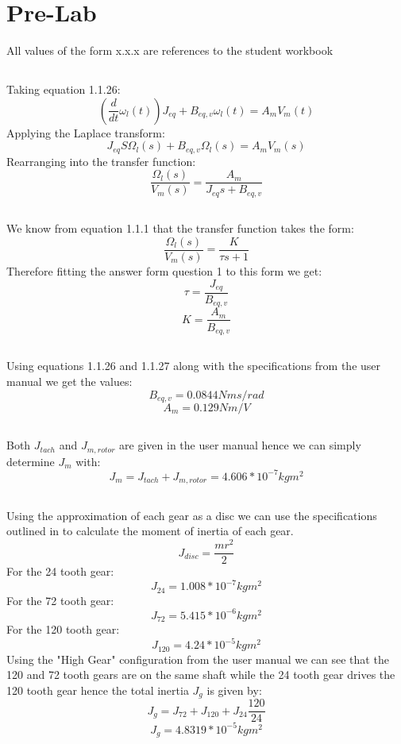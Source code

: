 \section{Pre-Lab}
All values of the form x.x.x are references to the student workbook \cite{workbook}
  \subsection{} Taking equation 1.1.26:
  $$ (\frac{d}{dt}\omega_{l}(t))J_{eq} + B_{eq,v}\omega_{l}(t) = A_{m}V_{m}(t) $$
  Applying the Laplace transform:
  $$ J_{eq}S\Omega_{l}(s) + B_{eq,v}\Omega_{l}(s) = A_{m}V_{m}(s) $$
  Rearranging into the transfer function:
  $$ \frac{\Omega_{l}(s)}{V_{m}(s)} = \frac{A_{m}}{J_{eq}s + B_{eq,v}} $$
  \subsection{} We know from equation 1.1.1 that the transfer function takes the form:
  $$  \frac{\Omega_{l}(s)}{V_{m}(s)} = \frac{K}{\tau s + 1} $$
  Therefore fitting the answer form question 1 to this form we get:
  $$ \tau = \frac{J_{eq}}{B_{eq,v}} $$
  $$ K = \frac{A_{m}}{B_{eq,v}} $$
  \subsection{} Using equations 1.1.26 and 1.1.27 along with the specifications from
  the user manual \cite{user_manual} we get the values:
  $$ B_{eq,v} = 0.0844 Nms/rad $$
  $$ A_{m} = 0.129 Nm/V $$
  \subsection{} Both $ J_{tach} $ and $ J_{m, rotor} $ are given in the user manual \cite{user_manual}
   hence we can simply determine $ J_{m} $ with:
  $$ J_{m} = J_{tach} + J_{m, rotor} = 4.606*10^{-7} kg m^{2} $$
  \subsection{} Using the approximation of each gear as a disc we can use the specifications
  outlined in \cite{user_manual} to calculate the moment of inertia of each gear.
  $$ J_{disc} = \frac{mr^{2}}{2} $$
  For the 24 tooth gear:
  $$ J_{24} = 1.008*10^{-7} kg m^{2} $$
  For the 72 tooth gear:
  $$ J_{72} = 5.415*10^{-6} kg m^{2} $$
  For the 120 tooth gear:
  $$ J_{120} = 4.24*10^{-5} kg m^{2} $$
  Using the "High Gear" configuration from the user manual \cite{user_manual}
  we can see that the 120 and 72 tooth gears are on the same shaft while the 24
  tooth gear drives the 120 tooth gear hence the total inertia $ J_{g}$ is given
  by:
  $$ J_{g} = J_{72} + J_{120} + J_{24}\frac{120}{24} $$
  $$ J_{g} = 4.8319 * 10^{-5} kg m^{2}$$
